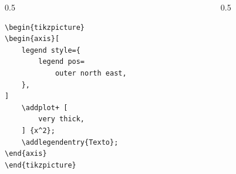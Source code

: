 \documentclass[12pt,aspectratio=169,ignorenonframetext]{ltxbeamer}
\begin{document}
\begin{frame}[fragile]
\bigskip

\begin{columns}
    \begin{column}{0.5\textwidth}
        \begin{verbatim}
\begin{tikzpicture}
\begin{axis}[
    legend style={
        legend pos=
            outer north east,
    },
]
    \addplot+ [
        very thick,
    ] {x^2};
    \addlegendentry{Texto};
\end{axis}
\end{tikzpicture}
        \end{verbatim}
    \end{column}
    {\color{gray} \vline}
    \begin{column}{0.5\textwidth}
        \lmr
    \end{column}
\end{columns}
\end{frame}
\end{document}
